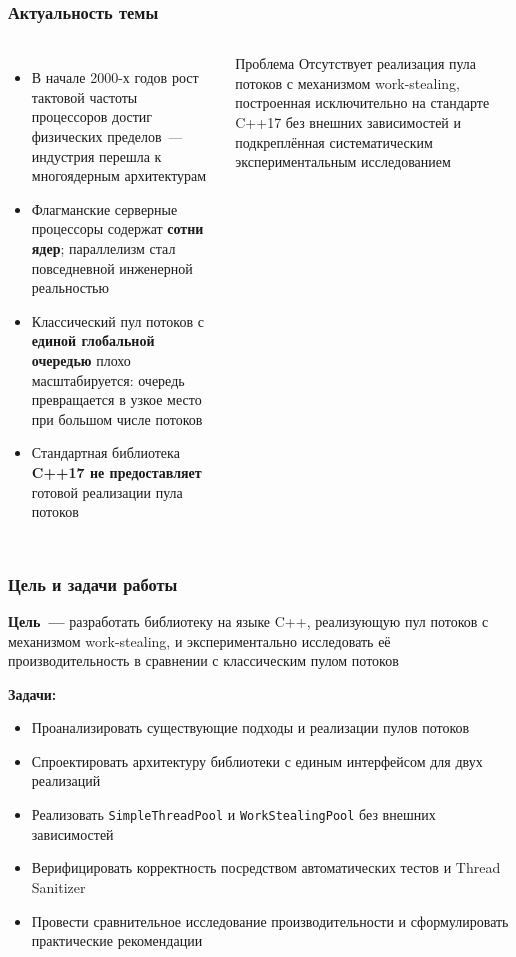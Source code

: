 \documentclass[pdf, hyperref={unicode}, aspectratio=169]{beamer}
\begin{document}
\frame{\titlepage}

\begin{frame}
\frametitle{Актуальность темы}

\begin{columns}[T]

\begin{itemize}
  \item В начале 2000-х годов рост тактовой частоты процессоров достиг
        физических пределов~--- индустрия перешла к многоядерным
        архитектурам
  \item Флагманские серверные процессоры содержат \textbf{сотни ядер};
        параллелизм стал повседневной инженерной реальностью
  \item Классический пул потоков с \textbf{единой глобальной очередью}
        плохо масштабируется: очередь превращается в узкое место при
        большом числе потоков
  \item Стандартная библиотека \textbf{C++17 не предоставляет} готовой
        реализации пула потоков
\end{itemize}

\begin{block}{Проблема}
  Отсутствует реализация пула потоков с механизмом work-stealing,
  построенная исключительно на стандарте C++17 без внешних
  зависимостей и подкреплённая систематическим экспериментальным
  исследованием
\end{block}

\end{columns}
\end{frame}


\begin{frame}
\frametitle{Цель и задачи работы}

\textbf{Цель~---} разработать библиотеку на языке C++, реализующую
пул потоков с механизмом work-stealing, и экспериментально исследовать
её производительность в сравнении с классическим пулом потоков

\medskip
\textbf{Задачи:}
\begin{itemize}
  \item Проанализировать существующие подходы и реализации пулов потоков
  \item Спроектировать архитектуру библиотеки с единым интерфейсом
        для двух реализаций
  \item Реализовать \texttt{SimpleThreadPool} и
        \texttt{WorkStealingPool} без внешних зависимостей
  \item Верифицировать корректность посредством автоматических тестов
        и Thread Sanitizer
  \item Провести сравнительное исследование производительности
        и сформулировать практические рекомендации
\end{itemize}
\end{frame}
\end{document}
